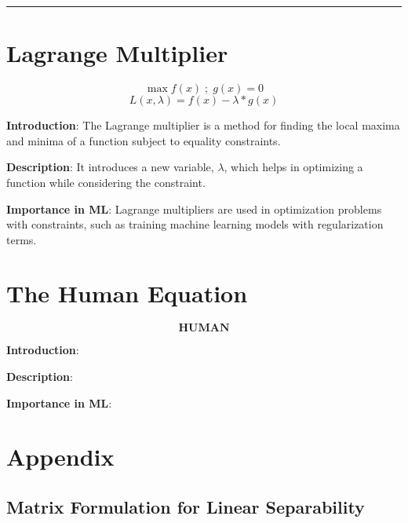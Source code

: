 \documentclass[
  12 pt,
  a4paper,
]{book}
\numberwithin{equation}{section}
\theoremstyle{plain}      %
\theoremstyle{definition} %
\theoremstyle{remark}     %
\theoremstyle{note}         %
\begin{document}
\begin{center}\rule{0.5\linewidth}{0.5pt}\end{center}

\newpage

\hypertarget{lagrange-multiplier}{%
\chapter{Lagrange Multiplier}\label{lagrange-multiplier}}

\[
\max f(x) \;; \; g(x) = 0
\] \[
L(x, \lambda) = f(x) - \lambda \ast g(x)
\]

\textbf{Introduction}: The Lagrange multiplier is a method for finding
the local maxima and minima of a function subject to equality
constraints.

\textbf{Description}: It introduces a new variable, \(\lambda\), which
helps in optimizing a function while considering the constraint.

\textbf{Importance in ML}: Lagrange multipliers are used in optimization
problems with constraints, such as training machine learning models with
regularization terms.

\newpage

\hypertarget{the-human-equation}{%
\chapter{The Human Equation}\label{the-human-equation}}

\[
\textbf{HUMAN}
\]

\textbf{Introduction}:

\textbf{Description}:

\textbf{Importance in ML}:

\newpage

\backmatter

\hypertarget{appendix}{%
\chapter{Appendix}\label{appendix}}

\hypertarget{matrix-formulation-for-linear-separability}{%
\section*{Matrix Formulation for Linear
Separability}\label{matrix-formulation-for-linear-separability}}
\end{document}
